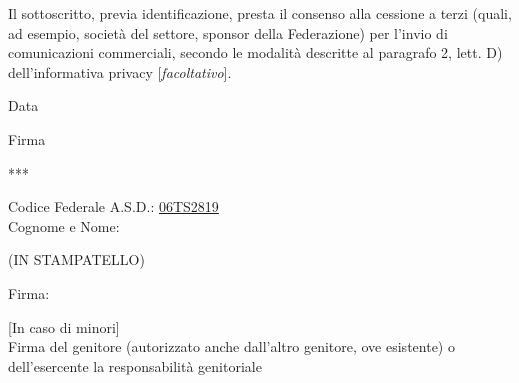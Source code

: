 \documentclass[
	twocolumn
]{djts}
\begin{document}
	Il sottoscritto, previa identificazione, presta il consenso alla cessione a terzi (quali, ad esempio, società del settore, sponsor della Federazione) per l'invio di comunicazioni commerciali, secondo le modalità descritte al paragrafo 2, lett. D) dell'informativa privacy [\textit{facoltativo}].
	\begin{center}
		\begin{minipage}{0.4\linewidth}
			\centering
			Data \\[5pt]
		\end{minipage}
		\begin{minipage}{0.4\linewidth}
			\centering
			Firma \\[5pt]
		\end{minipage}
	\end{center}
	
	\begin{center}
		\vspace{0.05in}
		***
		\vspace{0.05in}
	\end{center}
	
	\begin{minipage}{0.7\linewidth}
		Codice Federale A.S.D.: \underline{\hspace{2cm}06TS2819\hspace{2cm}} \\[10pt]
		Cognome e Nome: \fieldfill
		\begin{center}
			\vspace{-5pt}
			(IN STAMPATELLO)
			\vspace{5pt}
		\end{center}
		Firma: \fieldfill
	\end{minipage}
	
	\vspace{0.3in}
	[In caso di minori] \\[5pt]
	Firma del genitore (autorizzato anche dall'altro genitore, ove esistente) o dell'esercente la responsabilità genitoriale \\[10pt]
	\field{8cm}
	
	
\end{document}
